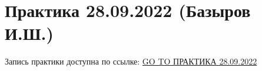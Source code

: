 \documentclass[main.tex]{subfiles}
\begin{document}

\section{Практика 28.09.2022 (Базыров И.Ш.)}

Запись практики доступна по ссылке: \href{https://disk.yandex.ru/d/HeQUisnwV0K5EQ/\%D0\%92\%D1\%82\%D0\%BE\%D1\%80\%D0\%BE\%D0\%B9\%20\%D0\%BA\%D1\%83\%D1\%80\%D1\%81\%20\%D0\%BC\%D0\%B0\%D0\%B3\%D0\%B8\%D1\%81\%D1\%82\%D1\%80\%D0\%B0\%D1\%82\%D1\%83\%D1\%80\%D1\%8B/\%D0\%93\%D0\%B8\%D0\%B4\%D1\%80\%D0\%BE\%D0\%B4\%D0\%B8\%D0\%BD\%D0\%B0\%D0\%BC\%D0\%B8\%D1\%87\%D0\%B5\%D1\%81\%D0\%BA\%D0\%BE\%D0\%B5\%20\%D0\%BC\%D0\%BE\%D0\%B4\%D0\%B5\%D0\%BB\%D0\%B8\%D1\%80\%D0\%BE\%D0\%B2\%D0\%B0\%D0\%BD\%D0\%B8\%D0\%B5/2022_09_28_\%D0\%93\%D0\%94\%D0\%9C_\%D0\%BF\%D1\%80\%D0\%B0\%D0\%BA\%D1\%82\%D0\%B8\%D0\%BA\%D0\%B03.mp4}{GO TO ПРАКТИКА 28.09.2022}
\end{document}
